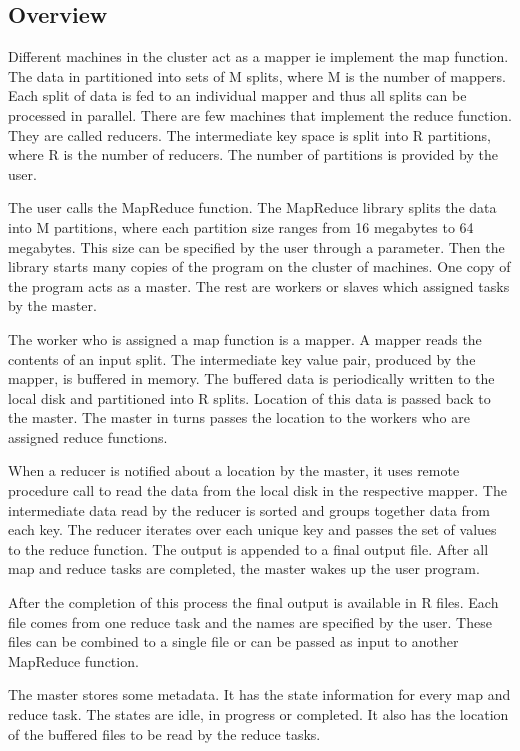 \documentclass[sigconf]{acmart}
\begin{document}
\subsection{Overview}  
\par Different machines in the cluster act as a mapper ie implement the map function. The data in partitioned into sets of M splits, where M is the number of mappers. Each split of data is fed to an individual mapper and thus all splits can be processed in parallel. There are few machines that implement the reduce function. They are called reducers. The intermediate key space is split into R partitions, where R is the number of reducers. The number of partitions is provided by the user. 

\par The user calls the MapReduce function. The MapReduce library splits the data into M partitions, where each partition size ranges from 16 megabytes to 64 megabytes. This size can be specified by the user through a parameter. Then the library starts many copies of the program on the cluster of machines. One copy of the program acts as a master. The rest are workers or slaves which assigned tasks by the master. 
\par The worker who is assigned a map function is a mapper. A mapper reads the contents of an input split. The intermediate key value pair, produced by the mapper, is buffered in memory. The buffered data is periodically written to the local disk and partitioned into R splits. Location of this data is passed back to the master. The master in turns passes the location to the workers who are assigned reduce functions. 
\par When a reducer is notified about a location by the master, it uses remote procedure call to read the data from the local disk in the respective mapper. The intermediate data read by the reducer is sorted and groups together data from each key. The reducer iterates over each unique key and passes the set of values to the reduce function. The output is appended to a final output file. After all map and reduce tasks are completed, the master wakes up the user program. 
\par After the completion of this process the final output is available in R files. Each file comes from one reduce task and the names are specified by the user.   These files can be combined to a single file or can be passed as input to another MapReduce function. 
\par The master stores some metadata. It has the state information for every map and reduce task. The states are idle, in progress or completed. It also has the location of the buffered files to be read by the reduce tasks. 
\end{document}
